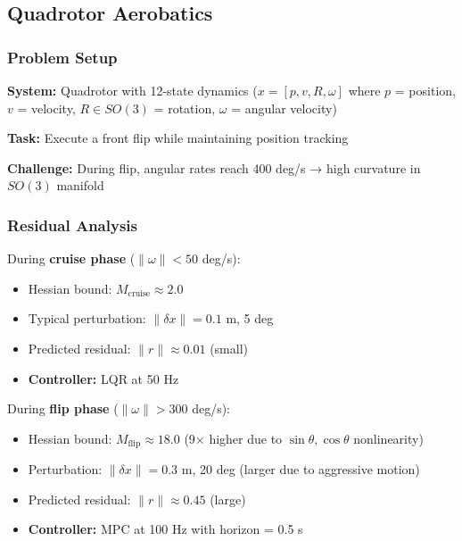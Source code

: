 \documentclass[
  letterpaper,
  DIV=11,
  numbers=noendperiod]{scrartcl}
\providecommand{\tightlist}{%
  \setlength{\itemsep}{0pt}\setlength{\parskip}{0pt}}\usepackage{longtable,booktabs,array}
\begin{document}
\subsection{Quadrotor Aerobatics}\label{sec-quadrotor}

\subsubsection{Problem Setup}\label{problem-setup}

\textbf{System:} Quadrotor with 12-state dynamics
(\(x = [p, v, R, \omega]\) where \(p\) = position, \(v\) = velocity,
\(R \in SO(3)\) = rotation, \(\omega\) = angular velocity)

\textbf{Task:} Execute a front flip while maintaining position tracking

\textbf{Challenge:} During flip, angular rates reach 400 deg/s → high
curvature in \(SO(3)\) manifold

\subsubsection{Residual Analysis}\label{residual-analysis}

During \textbf{cruise phase} (\(\|\omega\| < 50\) deg/s):

\begin{itemize}
\tightlist
\item
  Hessian bound: \(M_{\text{cruise}} \approx 2.0\)
\item
  Typical perturbation: \(\|\delta x\| = 0.1\) m, 5 deg
\item
  Predicted residual: \(\|r\| \approx 0.01\) (small)
\item
  \textbf{Controller:} LQR at 50 Hz
\end{itemize}

During \textbf{flip phase} (\(\|\omega\| > 300\) deg/s):

\begin{itemize}
\tightlist
\item
  Hessian bound: \(M_{\text{flip}} \approx 18.0\) (9× higher due to
  \(\sin\theta, \cos\theta\) nonlinearity)
\item
  Perturbation: \(\|\delta x\| = 0.3\) m, 20 deg (larger due to
  aggressive motion)
\item
  Predicted residual: \(\|r\| \approx 0.45\) (large)
\item
  \textbf{Controller:} MPC at 100 Hz with horizon = 0.5 s
\end{itemize}
\end{document}
